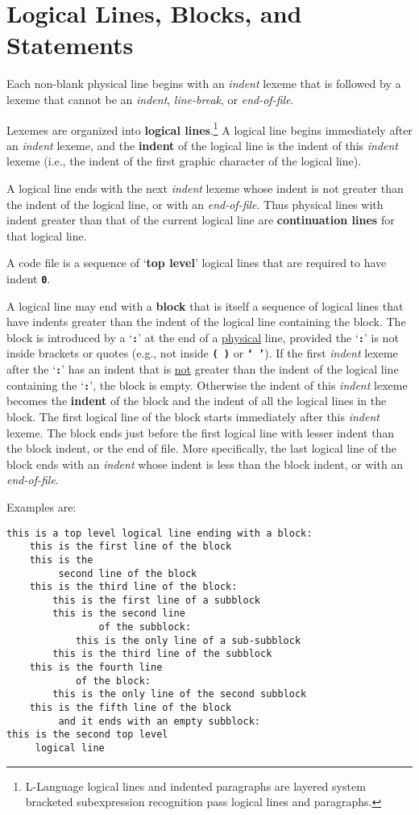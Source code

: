 \documentclass[12pt]{article}
\newcommand{\TT}[1]{{\tt \bfseries #1}}
\newcommand{\key}[1]{{\rm \bfseries #1}}
\newcommand{\skey}[2]{{\rm \bfseries #1#2}}
\newenvironment{indpar}[1][0.3in]%
	{\begin{list}{}%
		     {\setlength{\itemsep}{0in}%
		      \setlength{\topsep}{0in}%
		      \setlength{\parsep}{1ex}%
		      \setlength{\labelwidth}{#1}%
		      \setlength{\leftmargin}{#1}%
		      \addtolength{\leftmargin}{\labelsep}}%
	 \item}%
	{\end{list}}
\begin{document}
\section{Logical Lines, Blocks, and Statements}
\label{LOGICAL-LINES-BLOCKS-AND-STATEMENTS}

Each non-blank physical line begins with an {\em indent} lexeme
that is followed by a
lexeme that cannot be an {\em indent}, {\em line-break}, or
{\em end-of-file}.

Lexemes are organized into \skey{logical line}s.\footnote{
L-Language logical lines and indented paragraphs are
layered system bracketed subexpression recognition pass
logical lines and paragraphs.}
A logical line
begins immediately after an {\em indent} lexeme, and the
\key{indent} of the logical line is the
indent of this {\em indent} lexeme (i.e., the indent of the
first graphic character of the logical line).

A logical line ends with the next {\em indent} lexeme whose indent
is not greater than the indent of the logical line, or with an
{\em end-of-file}.  Thus physical
lines with indent greater than that of the current logical line
are \skey{continuation line}s for that logical line.

A code file is a sequence of `\key{top level}' logical lines that
are required to have indent \TT{0}.

A logical line may end with a \key{block} that is itself a sequence of
logical lines that have indents greater than the indent of the
logical line containing the block.
The block is introduced by a `\TT{:}' at the end
of a \underline{physical} line, provided the `\TT{:}' is not inside brackets
or quotes
(e.g., not inside \TT{(~)} or \TT{`~'}).
If the first {\em indent} lexeme after the
`\TT{:}' has an indent that is \underline{not} greater than the indent
of the logical line containing the `\TT{:}', the block is empty.
Otherwise the indent of this {\em indent} lexeme becomes the
\key{indent} of the block and the indent of all the
logical lines in the block.  The first logical line of the block
starts immediately after this {\em indent} lexeme.
The block ends just before the first
logical line with lesser indent than the block indent, or the end of file.
More specifically, the last logical line of the block ends with an
{\em indent} whose indent is less than the block indent, or with an
{\em end-of-file}.

Examples are:
\begin{indpar}\begin{verbatim}
this is a top level logical line ending with a block:
    this is the first line of the block
    this is the
         second line of the block
    this is the third line of the block:
        this is the first line of a subblock
        this is the second line
                of the subblock:
            this is the only line of a sub-subblock
        this is the third line of the subblock
    this is the fourth line
            of the block:
        this is the only line of the second subblock
    this is the fifth line of the block
         and it ends with an empty subblock:
this is the second top level
     logical line
\end{verbatim}\end{indpar}
\end{document}
